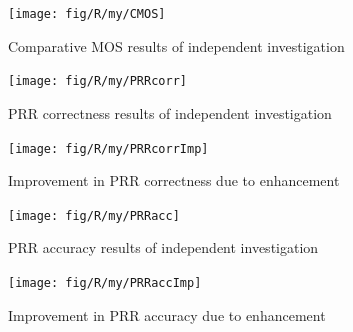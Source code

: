 \begin{figure}[h]
\noindent \begin{centering}
\texttt{[image: fig/R/my/CMOS]}
\par\end{centering}

\protect\caption{\label{fig:my-CMOS}Comparative \foreignlanguage{australian}{\acs{MOS}
results of independent investigation}%
}
\end{figure}


\begin{figure}[h]
\noindent \begin{centering}
\texttt{[image: fig/R/my/PRRcorr]}
\par\end{centering}

\protect\caption{\label{fig:my-PRRcorr}\foreignlanguage{australian}{\acs{PRR} correctness
results of independent investigation}%
}
\end{figure}


\begin{figure}[h]
\noindent \begin{centering}
\texttt{[image: fig/R/my/PRRcorrImp]}
\par\end{centering}

\protect\caption{\label{fig:my-PRRcorr-imp}Improvement in \foreignlanguage{australian}{\acs{PRR}
correctness due to enhancement}%
}
\end{figure}


\begin{figure}[h]
\noindent \begin{centering}
\texttt{[image: fig/R/my/PRRacc]}
\par\end{centering}

\protect\caption{\label{fig:my-PRRacc}\foreignlanguage{australian}{\acs{PRR} accuracy
results of independent investigation}%
}
\end{figure}


\begin{figure}[h]
\noindent \begin{centering}
\texttt{[image: fig/R/my/PRRaccImp]}
\par\end{centering}

\protect\caption{\label{fig:my-PRRacc-imp}Improvement in \foreignlanguage{australian}{\acs{PRR}
accuracy due to enhancement}%
}
\end{figure}


